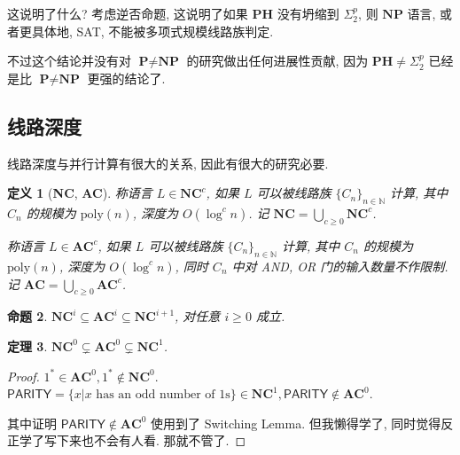 \documentclass[8pt]{article}
\theoremstyle{compact}
\newtheorem{theorem}{定理}[section]
\newtheorem{definition}[theorem]{定义}
\newtheorem{proposition}[theorem]{命题}
\def\ge{\geqslant}
\def\P{\textbf{P}}
\def\NP{\textbf{NP}}
\def\PH{\textbf{PH}}
\def\NC{\textbf{NC}}
\def\AC{\textbf{AC}}
\begin{document}
这说明了什么? 考虑逆否命题, 这说明了如果 $\PH$ 没有坍缩到 $\Sigma_2^p$, 则 $\NP$ 语言, 或者更具体地, \textsf{SAT}, 不能被多项式规模线路族判定.

不过这个结论并没有对 $\P \neq \NP$ 的研究做出任何进展性贡献, 因为 $\PH \neq \Sigma_2^p$ 已经是比 $\P \neq \NP$ 更强的结论了.

\subsection{线路深度}
线路深度与并行计算有很大的关系, 因此有很大的研究必要.
\begin{definition}[\NC, \AC]
	称语言 $L \in \NC^c$, 如果 $L$ 可以被线路族 $\{C_n\}_{n \in \mathbb N}$ 计算, 其中 $C_n$ 的规模为 $\text{poly}(n)$, 深度为 $O(\log^cn)$. 记 $\NC = \bigcup_{c \ge 0} \NC^c$.

	称语言 $L \in \AC^c$, 如果 $L$ 可以被线路族 $\{C_n\}_{n \in \mathbb N}$ 计算, 其中 $C_n$ 的规模为 $\text{poly}(n)$, 深度为 $O(\log^cn)$, 同时 $C_n$ 中对 AND, OR 门的输入数量不作限制. 记 $\AC = \bigcup_{c \ge 0} \AC^c$.
\end{definition}
\begin{proposition}
	$\NC^i \subseteq \AC^i \subseteq \NC^{i + 1}$, 对任意 $i \ge 0$ 成立.
\end{proposition}
\begin{theorem}
	$\NC^0 \subsetneq \AC^0 \subsetneq \NC^1$.
\end{theorem}
\begin{proof}
	$1^* \in \AC^0, 1^* \notin \NC^0$.
	$\textsf{PARITY} = \{x | x \text{ has an odd number of 1s}\} \in \NC^1, \textsf{PARITY} \notin \AC^0$. 

	其中证明 $\textsf{PARITY} \notin \AC^0$ 使用到了 Switching Lemma. 但我懒得学了, 同时觉得反正学了写下来也不会有人看. 那就不管了.
\end{proof}

\newpage
\end{document}
